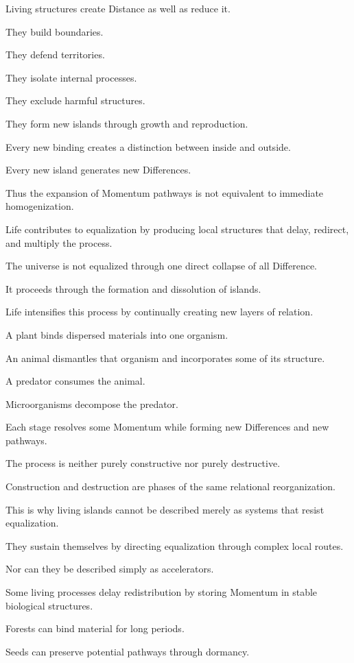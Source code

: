 Living structures create Distance as well as reduce it.

They build boundaries.

They defend territories.

They isolate internal processes.

They exclude harmful structures.

They form new islands through growth and reproduction.

Every new binding creates a distinction between inside and outside.

Every new island generates new Differences.

Thus the expansion of Momentum pathways is not equivalent to immediate homogenization.

Life contributes to equalization by producing local structures that delay, redirect, and multiply the process.

The universe is not equalized through one direct collapse of all Difference.

It proceeds through the formation and dissolution of islands.

Life intensifies this process by continually creating new layers of relation.

A plant binds dispersed materials into one organism.

An animal dismantles that organism and incorporates some of its structure.

A predator consumes the animal.

Microorganisms decompose the predator.

Each stage resolves some Momentum while forming new Differences and new pathways.

The process is neither purely constructive nor purely destructive.

Construction and destruction are phases of the same relational reorganization.

This is why living islands cannot be described merely as systems that resist equalization.

They sustain themselves by directing equalization through complex local routes.

Nor can they be described simply as accelerators.

Some living processes delay redistribution by storing Momentum in stable biological structures.

Forests can bind material for long periods.

Seeds can preserve potential pathways through dormancy.


